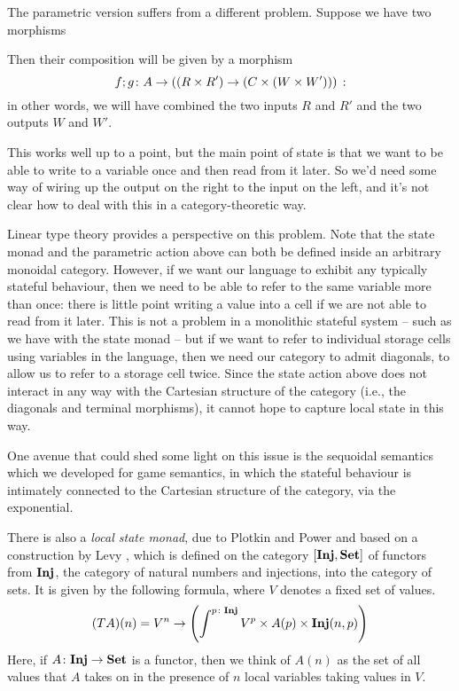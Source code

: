 The parametric version suffers from a different problem.  
Suppose we have two \Mellies morphisms
Then their composition will be given by a \Mellies morphism
\[
  f;g \colon A \to ((R \times R') \to (C \times (W \times W')))\,:
  \]
in other words, we will have combined the two inputs $R$ and $R'$ and the two outputs $W$ and $W'$.

This works well up to a point, but the main point of state is that we want to be able to write to a variable once and then read from it later.  
So we'd need some way of wiring up the output on the right to the input on the left, and it's not clear how to deal with this in a category-theoretic way.

Linear type theory provides a perspective on this problem.  
Note that the state monad and the parametric action above can both be defined inside an arbitrary monoidal category.  
However, if we want our language to exhibit any typically stateful behaviour, then we need to be able to refer to the same variable more than once: there is little point writing a value into a cell if we are not able to read from it later.  
This is not a problem in a monolithic stateful system -- such as we have with the state monad -- but if we want to refer to individual storage cells using variables in the language, then we need our category to admit diagonals, to allow us to refer to a storage cell twice.
Since the state action above does not interact in any way with the Cartesian structure of the category (i.e., the diagonals and terminal morphisms), it cannot hope to capture local state in this way.

One avenue that could shed some light on this issue is the sequoidal semantics which we developed for game semantics, in which the stateful behaviour is intimately connected to the Cartesian structure of the category, via the exponential.

There is also a \emph{local state monad}, due to Plotkin and Power \cite{PlotkinPower} and based on a construction by Levy \cite{PaulsThesis}, which is defined on the category $[{\normalfont\textbf{Inj}},{\normalfont\textbf{Set}}]$ of functors from ${\normalfont\textbf{Inj}}$, the category of natural numbers and injections, into the category of sets.  
It is given by the following formula, where $V$ denotes a fixed set of values.
\[
  (TA)(n) = V^n \to \left( \int^{p\colon{\normalfont\textbf{Inj}}} V^p \times A(p) \times {\normalfont\textbf{Inj}}(n, p) \right)
  \]
Here, if $A \colon {\normalfont\textbf{Inj}} \to {\normalfont\textbf{Set}}$ is a functor, then we think of $A(n)$ as the set of all values that $A$ takes on in the presence of $n$ local variables taking values in $V$.


